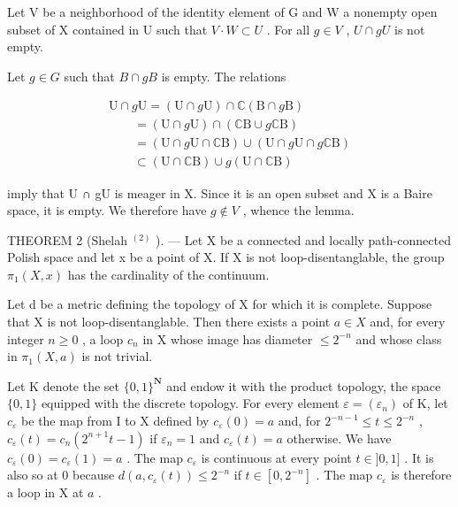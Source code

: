 Let V be a neighborhood of the identity element of G and W a nonempty open subset of X contained in U such that \(V \cdot W \subset U\) . For all \(g \in V\) , \(U \cap gU\) is not empty.

Let \(g \in G\) such that \(B \cap gB\) is empty. The relations

\[
\begin{array}{l} \mathrm{U} \cap g \mathrm{U} = (\mathrm{U} \cap g \mathrm{U}) \cap \mathbb {C} (\mathrm{B} \cap g \mathrm{B}) \\ \qquad = (\mathrm{U} \cap g \mathrm{U}) \cap (\mathbb {C} \mathrm{B} \cup g \mathbb {C} \mathrm{B}) \\ \qquad = (\mathrm{U} \cap g \mathrm{U} \cap \mathbb {C} \mathrm{B}) \cup (\mathrm{U} \cap g \mathrm{U} \cap g \mathbb {C} \mathrm{B}) \\ \qquad \subset (\mathrm{U} \cap \mathbb {C} \mathrm{B}) \cup g (\mathrm{U} \cap \mathbb {C} \mathrm{B}) \end{array}
\]

imply that U ∩ gU is meager in X. Since it is an open subset and X is a Baire space, it is empty. We therefore have \(g \notin V\) , whence the lemma.

THEOREM 2 (Shelah \(^{(2)}\) ). --- Let X be a connected and locally path-connected Polish space and let x be a point of X. If X is not loop-disentanglable, the group \(\pi_{1}(X,x)\) has the cardinality of the continuum.

Let d be a metric defining the topology of X for which it is complete. Suppose that X is not loop-disentanglable. Then there exists a point \(a \in X\) and, for every integer \(n \geqslant 0\) , a loop \(c_{n}\) in X whose image has diameter \(\leqslant 2^{-n}\) and whose class in \(\pi_{1}(X, a)\) is not trivial.

Let K denote the set \(\{0,1\}^{\mathbf{N}}\) and endow it with the product topology, the space \(\{0,1\}\) equipped with the discrete topology. For every element \(\varepsilon = (\varepsilon_n)\) of K, let \(c_{\varepsilon}\) be the map from I to X defined by \(c_{\varepsilon}(0) = a\) and, for \(2^{-n - 1} \leqslant t \leqslant 2^{-n}\) , \(c_{\varepsilon}(t) = c_n(2^{n + 1}t - 1)\) if \(\varepsilon_n = 1\) and \(c_{\varepsilon}(t) = a\) otherwise. We have \(c_{\varepsilon}(0) = c_{\varepsilon}(1) = a\) . The map \(c_{\varepsilon}\) is continuous at every point \(t \in ]0,1]\) . It is also so at 0 because \(d(a,c_{\varepsilon}(t)) \leqslant 2^{-n}\) if \(t \in [0,2^{-n}] \) . The map \(c_{\varepsilon}\) is therefore a loop in X at \(a\) .

